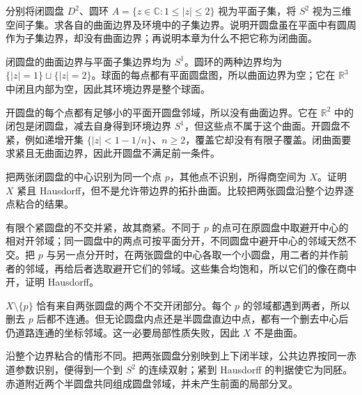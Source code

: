 \BookExercises

\begin{exercise}\label{g1:ex:surface-intrinsic-boundary}
	分别将闭圆盘 \(D^2\)、圆环 \(A=\{z\in\mathbb C:1\le |z|\le2\}\) 视为平面子集，将 \(S^2\) 视为三维空间子集。求各自的曲面边界及环境中的子集边界。说明开圆盘虽在平面中有圆周作为子集边界，却没有曲面边界；再说明本章为什么不把它称为闭曲面。
\end{exercise}
\begin{solution}
	闭圆盘的曲面边界与平面子集边界均为 \(S^1\)。圆环的两种边界均为 \(\{|z|=1\}\sqcup\{|z|=2\}\)。球面的每点都有平面圆盘图，所以曲面边界为空；它在 \(\mathbb R^3\) 中闭且内部为空，因此其环境边界是整个球面。

	开圆盘的每个点都有足够小的平面开圆盘邻域，所以没有曲面边界。它在 \(\mathbb R^2\) 中的闭包是闭圆盘，减去自身得到环境边界 \(S^1\)，但这些点不属于这个曲面。开圆盘不紧，例如递增开集 \(\{|z|<1-1/n\}\)、\(n\ge2\)，覆盖它却没有有限子覆盖。闭曲面要求紧且无曲面边界，因此开圆盘不满足前一条件。
\end{solution}

\begin{exercise}\label{g1:ex:wedge-disks-not-surface}
	把两张闭圆盘的中心识别为同一个点 \(p\)，其他点不识别，所得商空间为 \(X\)。证明 \(X\) 紧且 Hausdorff，但不是允许带边界的拓扑曲面。比较把两张圆盘沿整个边界逐点粘合的结果。
\end{exercise}
\begin{solution}
	有限个紧圆盘的不交并紧，故其商紧。不同于 \(p\) 的点可在原圆盘中取避开中心的相对开邻域；同一圆盘中的两点可按平面分开，不同圆盘中避开中心的邻域天然不交。把 \(p\) 与另一点分开时，在两张圆盘的中心各取一个小圆盘，用二者的并作前者的邻域，再给后者选取避开它们的邻域。这些集合均饱和，所以它们的像在商中开，证明 Hausdorff。

	\(X\setminus\{p\}\) 恰有来自两张圆盘的两个不交开闭部分。每个 \(p\) 的邻域都遇到两者，所以删去 \(p\) 后都不连通。但无论圆盘内点还是半圆盘直边中点，都有一个删去中心后仍道路连通的坐标邻域。这一必要局部性质失败，因此 \(X\) 不是曲面。

	沿整个边界粘合的情形不同。把两张圆盘分别映到上下闭半球，公共边界按同一赤道参数识别，便得到一个到 \(S^2\) 的连续双射；紧到 Hausdorff 的判据使它为同胚。赤道附近两个半圆盘共同组成圆盘邻域，并未产生前面的局部分叉。
\end{solution}

